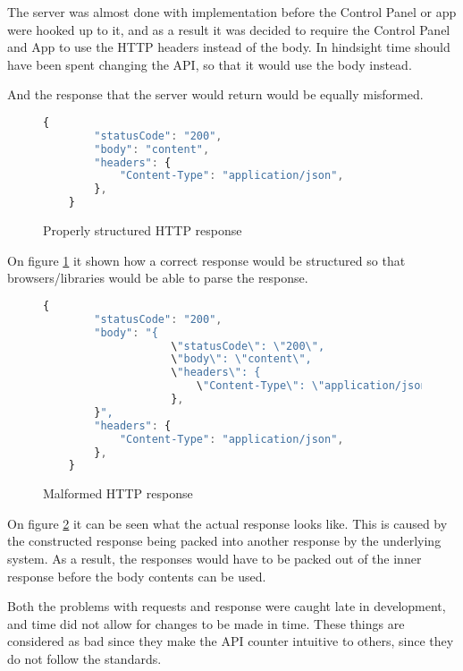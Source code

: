 The server was almost done with implementation before the Control Panel or app were hooked up to it, and as a result it was decided to require the Control Panel and App to use the HTTP headers instead of the body. In hindsight time should have been spent changing the API, so that it would use the body instead.

And the response that the server would return would be equally misformed.

\begin{figure}[H]
    \centering
    \begin{lstlisting}[language=Javascript]
    {
        "statusCode": "200",
        "body": "content",
        "headers": {
            "Content-Type": "application/json",
        },
    }
    \end{lstlisting}
    \caption{Properly structured HTTP response}
    \label{fig:properhttpresponse}
\end{figure}

On figure \ref{fig:properhttpresponse} it shown how a correct response would be structured so that browsers/libraries would be able to parse the response.

\begin{figure}[H]
    \centering
    \begin{lstlisting}[language=Javascript]
    {
        "statusCode": "200",
        "body": "{
                    \"statusCode\": \"200\",
                    \"body\": \"content\",
                    \"headers\": {
                        \"Content-Type\": \"application/json\",
                    },
        }",
        "headers": {
            "Content-Type": "application/json",
        },
    }
    \end{lstlisting}
    \caption{Malformed HTTP response}
    \label{fig:malformedhttpresponse}
\end{figure}

On figure \ref{fig:malformedhttpresponse} it can be seen what the actual response looks like. This is caused by the constructed response being packed into another response by the underlying system. As a result, the responses would have to be packed out of the inner response before the body contents can be used.

Both the problems with requests and response were caught late in development, and time did not allow for changes to be made in time.
These things are considered as bad since they make the API counter intuitive to others, since they do not follow the standards.

